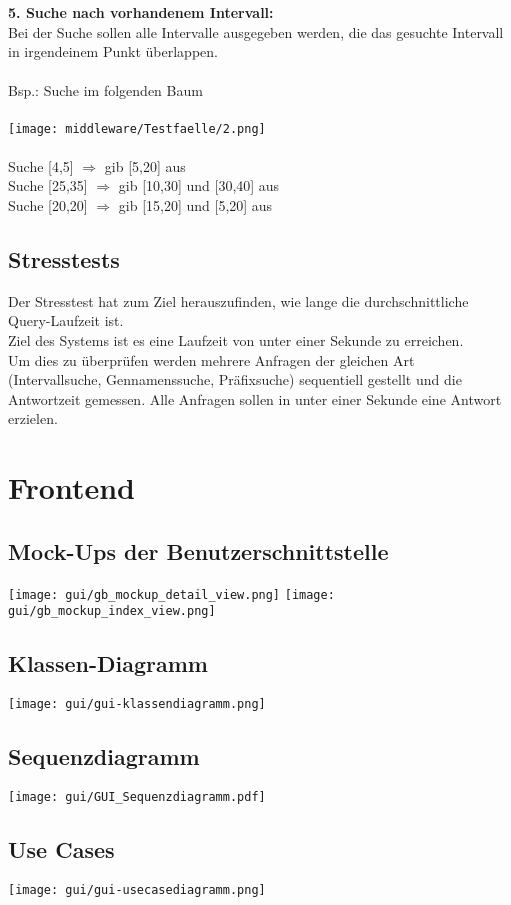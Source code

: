 \documentclass{scrartcl}
\begin{document}
\textbf{5. Suche nach vorhandenem Intervall:}\\
Bei der Suche sollen alle Intervalle ausgegeben werden, die das gesuchte Intervall in irgendeinem Punkt überlappen.\\\\
Bsp.: Suche im folgenden Baum\\\\
\texttt{[image: middleware/Testfaelle/2.png]}\\\\Suche [4,5] $\Rightarrow$ gib [5,20] aus\\
Suche [25,35] $\Rightarrow$ gib [10,30] und [30,40] aus\\
Suche [20,20] $\Rightarrow$ gib [15,20] und [5,20] aus
\subsection{Stresstests}
Der Stresstest hat zum Ziel herauszufinden, wie lange die durchschnittliche Query-Laufzeit ist.\\
Ziel des Systems ist es eine Laufzeit von unter einer Sekunde zu erreichen.\\
Um dies zu überprüfen werden mehrere Anfragen der gleichen Art (Intervallsuche, Gennamenssuche, Präfixsuche) sequentiell gestellt und die Antwortzeit gemessen. Alle Anfragen sollen in unter einer Sekunde eine Antwort erzielen.
\newpage

\section{Frontend}
\subsection{Mock-Ups der Benutzerschnittstelle}
\texttt{[image: gui/gb\_mockup\_detail\_view.png]}
\texttt{[image: gui/gb\_mockup\_index\_view.png]}
\subsection{Klassen-Diagramm}
\texttt{[image: gui/gui-klassendiagramm.png]}
\subsection{Sequenzdiagramm}
\texttt{[image: gui/GUI\_Sequenzdiagramm.pdf]}
\subsection{Use Cases}
\texttt{[image: gui/gui-usecasediagramm.png]}
\end{document}
